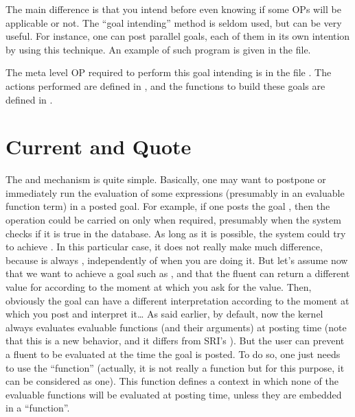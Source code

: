 The main difference is that you intend before even knowing if some OPs
will be applicable or not. The ``goal intending'' method is seldom
used, but can be very useful. For instance, one can post parallel goals,
each of them in its own intention by using this technique. An example of
such program is given in the  file.

The meta level OP required to perform this goal intending is in the file
. The actions performed are defined in
, and the functions to build these goals are
defined in .

\section{Current and Quote}

The  and  mechanism is quite simple. Basically, one
may want to postpone or immediately run the evaluation of some expressions
(presumably in an evaluable function term) in a posted goal.  For example, if
one posts the goal , then the \code{+} operation could
be carried on only when required, presumably when the system checks if it is
true in the database. As long as it is possible, the system could try to
achieve . In this particular case, it does not really
make much difference, because  is always , independently
of when you are doing it. But let's assume now that we want to achieve a goal
such as , and that the fluent
 can return a different value for  according
to the moment at which you ask for the value. Then, obviously the goal  can have a different interpretation according to
the moment at which you post and interpret it\dots{} As said earlier, by
default, now the kernel always evaluates evaluable functions (and their
arguments) at posting time (note that this is a new behavior, and it differs
from SRI's \OPRS{}). But the user can prevent a fluent to be evaluated at the
time the goal is posted.  To do so, one just needs to use the 
``function'' (actually, it is not really a function but for this purpose, it
can be considered as one). This  function defines a context in
which none of the evaluable functions will be evaluated at posting time, unless
they are embedded in a  ``function''.

